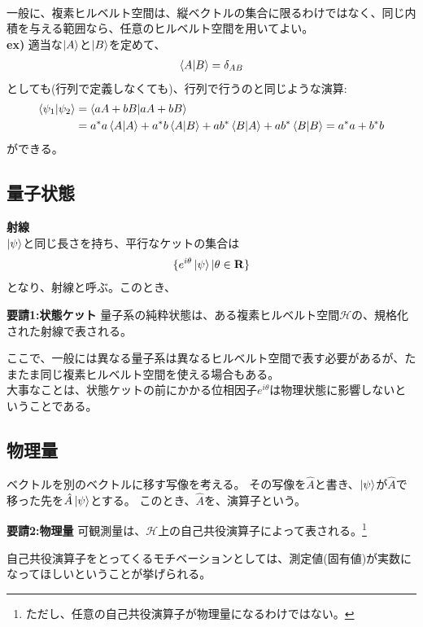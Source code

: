 \documentclass[a4paper,11pt]{jsarticle}
\begin{document}
\\
一般に、複素ヒルベルト空間は、縦ベクトルの集合に限るわけではなく、同じ内積を与える範囲なら、任意のヒルベルト空間を用いてよい。\\
\textbf{ex)}
適当な$\ket{A}$と$\ket{B}$を定めて、
\begin{align}
\braket{A}{B}=\delta_{AB}
\end{align}
としても(行列で定義しなくても)、行列で行うのと同じような演算:
\begin{align}
\braket{\psi_1}{\psi_2}&=\braket{aA+bB}{aA+bB}\\
&=a^{*}a\braket{A}{A}+a^{*}b\braket{A}{B}+ab^{*}\braket{B}{A}+ab^{*}\braket{B}{B}
=a^{*}a+b^{*}b
\end{align}
ができる。
\bigskip

\subsection{量子状態}
\textbf{射線}\\
$\ket{\psi}$と同じ長さを持ち、平行なケットの集合は
\begin{align}
\{e^{i\theta}\ket{\psi}|\theta \in\vb{R}\}
\end{align}
となり、射線と呼ぶ。このとき、
\begin{itembox}[l]{\textbf {要請1:状態ケット}}
量子系の純粋状態は、ある複素ヒルベルト空間$\mathcal H$の、規格化された射線で表される。
\end{itembox}
ここで、一般には異なる量子系は異なるヒルベルト空間で表す必要があるが、たまたま同じ複素ヒルベルト空間を使える場合もある。\\
大事なことは、状態ケットの前にかかる位相因子$e^{i\theta}$は物理状態に影響しないということである。

\subsection{物理量}
ベクトルを別のベクトルに移す写像を考える。
その写像を$\hat{A}$と書き、$\ket{\psi}$が$\hat{A}$で移った先を$\hat{A}\ket{\psi}$とする。
このとき、$\hat{A}$を、演算子という。

\begin{itembox}[l]{\textbf {要請2:物理量}}
可観測量は、$\mathcal H$上の自己共役演算子によって表される。\footnote{ただし、任意の自己共役演算子が物理量になるわけではない。}
\end{itembox}
自己共役演算子をとってくるモチベーションとしては、測定値(固有値)が実数になってほしいということが挙げられる。\\
\end{document}

